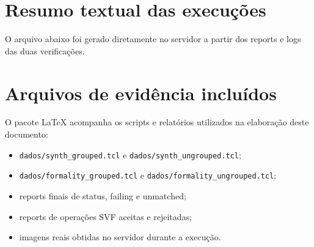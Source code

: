\documentclass[11pt,a4paper]{article}
\begin{document}
\appendix

\section{Resumo textual das execuções}

O arquivo abaixo foi gerado diretamente no servidor a partir dos reports e logs das duas verificações.



\section{Arquivos de evidência incluídos}

O pacote LaTeX acompanha os scripts e relatórios utilizados na elaboração deste documento:

\begin{itemize}[leftmargin=1.2cm,itemsep=2pt]
    \item \texttt{dados/synth\_grouped.tcl} e \texttt{dados/synth\_ungrouped.tcl};
    \item \texttt{dados/formality\_grouped.tcl} e \texttt{dados/formality\_ungrouped.tcl};
    \item reports finais de status, failing e unmatched;
    \item reports de operações SVF aceitas e rejeitadas;
    \item imagens reais obtidas no servidor durante a execução.
\end{itemize}
\end{document}
